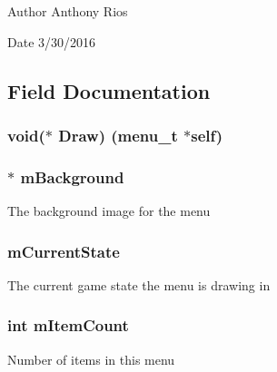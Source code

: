 \begin{DoxyAuthor}{Author}
Anthony Rios 
\end{DoxyAuthor}
\begin{DoxyDate}{Date}
3/30/2016 
\end{DoxyDate}


\subsection{Field Documentation}
\subsubsection[{\texorpdfstring{Draw}{Draw}}]{\setlength{\rightskip}{0pt plus 5cm}void($\ast$ Draw) ({\bf menu\+\_\+t} $\ast$self)}\hypertarget{structmenu__s_ab0d1e3b40626060280d7a069ef441961}{}\label{structmenu__s_ab0d1e3b40626060280d7a069ef441961}
\subsubsection[{\texorpdfstring{m\+Background}{mBackground}}]{$\ast$ m\+Background}\hypertarget{structmenu__s_ab2cdfd66047e062b1da2948d07f9f90d}{}\label{structmenu__s_ab2cdfd66047e062b1da2948d07f9f90d}
The background image for the menu 
\subsubsection[{\texorpdfstring{m\+Current\+State}{mCurrentState}}]{ m\+Current\+State}\hypertarget{structmenu__s_a0f4930e7bfb881141c55f2ff6532343c}{}\label{structmenu__s_a0f4930e7bfb881141c55f2ff6532343c}
The current game state the menu is drawing in 
\subsubsection[{\texorpdfstring{m\+Item\+Count}{mItemCount}}]{\setlength{\rightskip}{0pt plus 5cm}int m\+Item\+Count}\hypertarget{structmenu__s_a20f9c9276293cccf509c5102dad0698a}{}\label{structmenu__s_a20f9c9276293cccf509c5102dad0698a}
Number of items in this menu 

